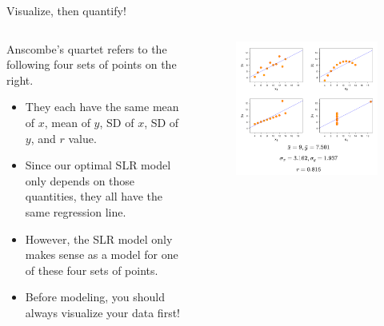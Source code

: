 \documentclass[aspectratio=169]{../latex_main/tntbeamer}  %
\begin{document}
	
	\begin{frame}{Visualize, then quantify!}
	  
	    \begin{columns}
    	    \begin{column}{.6\textwidth}
    	           Anscombe’s quartet refers to the following four sets of points on the right.
            	    \begin{itemize}
            	        \item  They each have the same mean of $x$, mean of $y$, SD of $x$, SD of $y$, and $r$ value.
            	        \item Since our optimal SLR model only depends on those quantities, they all have the same regression line.
            	        \item However, the SLR model only makes sense as a model for one of these four sets of points.
            	        \item Before modeling, you should always visualize your data first!
            	     \end{itemize}
    	    \end{column}
	  
	        \begin{column}{.4\textwidth}
    	           \begin{figure}
    	               \includegraphics[scale=.33]{Bild8}
    	           \end{figure}
    	    \end{column}
	       \end{columns}
	\end{frame}
\end{document}
